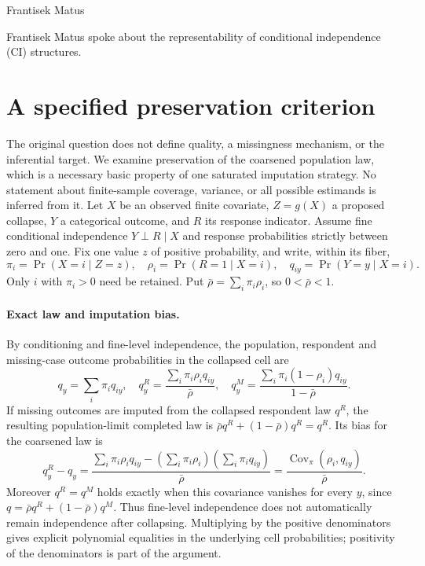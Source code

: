 \documentclass[11pt]{article}
\begin{document}
Frantisek Matus

Frantisek Matus spoke about the representability of conditional independence (CI) structures.

\section{A specified preservation criterion}
The original question does not define quality, a missingness mechanism,
or the inferential target. We examine preservation of the coarsened
population law, which is a necessary basic property of one saturated
imputation strategy. No statement about finite-sample coverage, variance,
or all possible estimands is inferred from it.
Let $X$ be an observed finite covariate, $Z=g(X)$ a proposed collapse,
$Y$ a categorical outcome, and $R$ its response indicator. Assume fine
conditional independence $Y\perp R\mid X$ and response probabilities
strictly between zero and one. Fix one value $z$ of positive probability,
and write, within its fiber,
\[
\pi_i=\Pr(X=i\mid Z=z),\quad
\rho_i=\Pr(R=1\mid X=i),\quad q_{iy}=\Pr(Y=y\mid X=i).
\]
Only $i$ with $\pi_i>0$ need be retained. Put
$\bar\rho=\sum_i\pi_i\rho_i$, so $0<\bar\rho<1$.

\paragraph{Exact law and imputation bias.}
By conditioning and fine-level independence, the population, respondent
and missing-case outcome probabilities in the collapsed cell are
\[
q_y=\sum_i\pi_iq_{iy},\quad
q_y^R=\frac{\sum_i\pi_i\rho_iq_{iy}}{\bar\rho},\quad
q_y^M=\frac{\sum_i\pi_i(1-\rho_i)q_{iy}}{1-\bar\rho}.
\]
If missing outcomes are imputed from the collapsed respondent law
$q^R$, the resulting population-limit completed law is
$\bar\rho q^R+(1-\bar\rho)q^R=q^R$. Its bias for the coarsened law is
\[
q_y^R-q_y=
\frac{\sum_i\pi_i\rho_iq_{iy}
       -(\sum_i\pi_i\rho_i)(\sum_i\pi_iq_{iy})}{\bar\rho}
=\frac{\operatorname{Cov}_{\pi}(\rho_i,q_{iy})}{\bar\rho}.
\]
Moreover $q^R=q^M$ holds exactly when this covariance vanishes for
every $y$, since $q=\bar\rho q^R+(1-\bar\rho)q^M$.
Thus fine-level independence does not automatically remain independence
after collapsing. Multiplying by the positive denominators gives
explicit polynomial equalities in the underlying cell probabilities;
positivity of the denominators is part of the argument.
\end{document}

